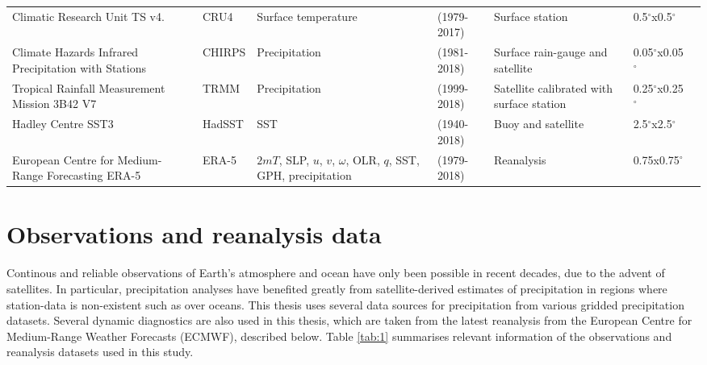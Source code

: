 \begin{sidewaystable}
\begin{tabular}{p{4.5cm}|p{1.47cm}p{3.2cm}p{2.12cm}p{}p{2.12cm}p{3.24cm}}
Climatic Research Unit TS  v4.     & CRU4         & Surface temperature  & (1979-2017)       &  Surface station    &  0.5$^\circ$x0.5$^\circ$   &        \citep{harris2014}                            \\
  Climate Hazards Infrared Precipitation with Stations   & CHIRPS          & Precipitation       & (1981-2018)       &  Surface rain-gauge and satellite               &  0.05$^\circ$x0.05$^\circ$ & \citep{funk2015}              \\
Tropical Rainfall Measurement Mission 3B42 V7       & TRMM          & Precipitation       & (1999-2018)   & Satellite calibrated with surface station   & 0.25$^\circ$x0.25$^\circ$  &  \citep{mission2011} \\
Hadley Centre SST3                           & HadSST          & SST               & (1940-2018)   & Buoy and satellite              & 2.5$^\circ$x2.5$^\circ$  &  \citep{kennedy2011} \\
European Centre for Medium-Range Forecasting ERA-5                            & ERA-5             & $2mT$, SLP, $u$, $v$, $\omega$, OLR, $q$, SST, GPH, precipitation    &  (1979-2018)    &  Reanalysis       & 0.75x0.75$^\circ$ &  \citep{era5,era5hersbach}
\end{tabular}

\end{sidewaystable}

\section{Observations and reanalysis data} \label{sq:obsdata}
Continous and reliable observations of Earth's  atmosphere and ocean have only been possible in recent decades, due to the advent of satellites. In particular, precipitation analyses have benefited greatly from satellite-derived estimates of precipitation in regions where station-data is non-existent such as over oceans.  %
This thesis uses several data sources for precipitation from various gridded precipitation datasets. 
Several dynamic diagnostics are also used in this thesis, which are taken from the latest reanalysis from the European Centre for Medium-Range Weather Forecasts (ECMWF), described below. 
Table \ref{tab:1} summarises relevant information of the observations and reanalysis datasets used in this study.
 

